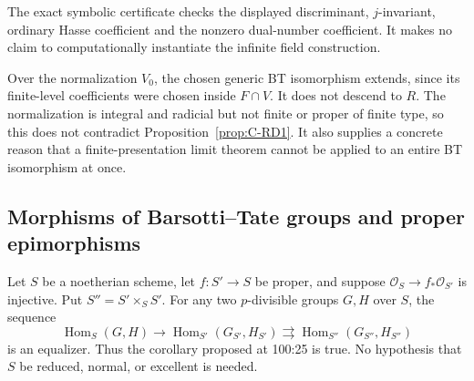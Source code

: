 \begin{remark}\label{auto:C:3d23f9b8075d}

The exact symbolic certificate 
checks the displayed discriminant, $j$-invariant, ordinary Hasse
coefficient and the nonzero dual-number coefficient. It makes no
claim to computationally instantiate the infinite field construction.
\end{remark}

\begin{remark}\label{auto:C:2b1cfc4567d4}

Over the normalization $V_0$, the chosen generic BT isomorphism
extends, since its finite-level coefficients were chosen inside
$F\cap V$. It does not descend to $R$. The normalization is integral
and radicial but not finite or proper of finite type, so this does
not contradict Proposition~\ref{prop:C-RD1}. It also supplies a
concrete reason that a finite-presentation limit theorem cannot be
applied to an entire BT isomorphism at once.
\end{remark}

\subsection{Morphisms of Barsotti--Tate groups and proper epimorphisms}

\begin{proposition}\label{prop:C-RD1}
Let $S$ be a noetherian scheme, let $f:S'\to S$ be proper, and suppose
$\mathcal O_S\to f_*\mathcal O_{S'}$ is injective. Put $S''=S'\times_S S'$.
For any two $p$-divisible groups $G,H$ over $S$, the sequence
\[
 \operatorname{Hom}_S(G,H)\longrightarrow
 \operatorname{Hom}_{S'}(G_{S'},H_{S'})
 \rightrightarrows
 \operatorname{Hom}_{S''}(G_{S''},H_{S''})
\]
is an equalizer. Thus the corollary proposed at 100:25 is true. No hypothesis
that $S$ be reduced, normal, or excellent is needed.
\end{proposition}

